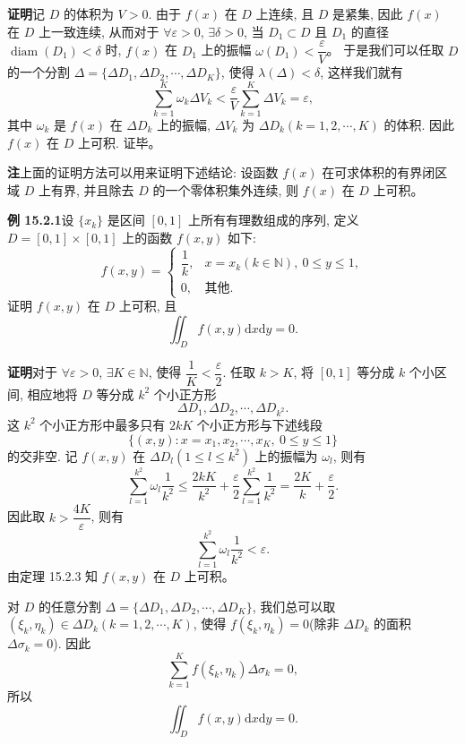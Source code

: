 \documentclass[UTF8, 12pt, fontset=fandol, oneside]{ctexart}
\begin{document}
\noindent\textbf{证明}\quad 记 $D$ 的体积为 $V>0$. 由于 $f(x)$ 在 $D$ 上连续, 且 $D$ 是紧集, 因此 $f(x)$ 在 $D$ 上一致连续, 从而对于 $\forall\varepsilon>0$, $\exists\delta>0$, 当 $D_1\subset D$ 且 $D_1$ 的直径 $\operatorname{diam}(D_1)<\delta$ 时, $f(x)$ 在 $D_1$ 上的振幅 $\omega(D_1)<\dfrac{\varepsilon}{V}$。
于是我们可以任取 $D$ 的一个分割 $\Delta=\{\Delta D_1,\Delta D_2,\cdots,\Delta D_K\}$, 使得 $\lambda(\Delta)<\delta$, 这样我们就有
\[
  \sum_{k=1}^K\omega_k\Delta V_k<\frac{\varepsilon}{V}\sum_{k=1}^K\Delta V_k=\varepsilon,
\]
其中 $\omega_k$ 是 $f(x)$ 在 $\Delta D_k$ 上的振幅, $\Delta V_k$ 为 $\Delta D_k(k=1,2,\cdots,K)$ 的体积. 因此 $f(x)$ 在 $D$ 上可积. 证毕。

\noindent\textbf{注}\quad 上面的证明方法可以用来证明下述结论: 设函数 $f(x)$ 在可求体积的有界闭区域 $D$ 上有界, 并且除去 $D$ 的一个零体积集外连续, 则 $f(x)$ 在 $D$ 上可积。

\noindent\textbf{例 15.2.1}\quad 设 $\{x_k\}$ 是区间 $[0,1]$ 上所有有理数组成的序列, 定义 $D=[0,1]\times[0,1]$ 上的函数 $f(x,y)$ 如下:
\[
  f(x,y)=
  \begin{cases}
    \dfrac1k, & x=x_k(k\in\mathbb N),\ 0\leqslant y\leqslant1,\\
    0, & \text{其他}.
  \end{cases}
\]
证明 $f(x,y)$ 在 $D$ 上可积, 且
\[
  \iint_D f(x,y)\mathrm dx\mathrm dy=0.
\]

\noindent\textbf{证明}\quad 对于 $\forall\varepsilon>0$, $\exists K\in\mathbb N$, 使得 $\dfrac1K<\dfrac{\varepsilon}{2}$. 任取 $k>K$, 将 $[0,1]$ 等分成 $k$ 个小区间, 相应地将 $D$ 等分成 $k^2$ 个小正方形
\[
  \Delta D_1,\Delta D_2,\cdots,\Delta D_{k^2}.
\]
这 $k^2$ 个小正方形中最多只有 $2kK$ 个小正方形与下述线段
\[
  \{(x,y):x=x_1,x_2,\cdots,x_K,\ 0\leqslant y\leqslant1\}
\]
的交非空. 记 $f(x,y)$ 在 $\Delta D_l(1\leqslant l\leqslant k^2)$ 上的振幅为 $\omega_l$, 则有
\[
  \sum_{l=1}^{k^2}\omega_l\frac1{k^2}
  \leqslant \frac{2kK}{k^2}+\frac{\varepsilon}{2}\sum_{l=1}^{k^2}\frac1{k^2}
  =\frac{2K}{k}+\frac{\varepsilon}{2}.
\]
因此取 $k>\dfrac{4K}{\varepsilon}$, 则有
\[
  \sum_{l=1}^{k^2}\omega_l\frac1{k^2}<\varepsilon.
\]
由定理 15.2.3 知 $f(x,y)$ 在 $D$ 上可积。

对 $D$ 的任意分割 $\Delta=\{\Delta D_1,\Delta D_2,\cdots,\Delta D_K\}$, 我们总可以取 $(\xi_k,\eta_k)\in\Delta D_k(k=1,2,\cdots,K)$, 使得 $f(\xi_k,\eta_k)=0$(除非 $\Delta D_k$ 的面积 $\Delta\sigma_k=0$). 因此
\[
  \sum_{k=1}^K f(\xi_k,\eta_k)\Delta\sigma_k=0,
\]
所以
\[
  \iint_D f(x,y)\mathrm dx\mathrm dy=0.
\]
\end{document}
